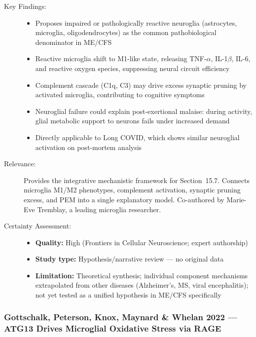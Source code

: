 
\begin{description}
    \item[Key Findings:]
    \begin{itemize}
        \item Proposes impaired or pathologically reactive neuroglia (astrocytes, microglia, oligodendrocytes) as the common pathobiological denominator in ME/CFS
        \item Reactive microglia shift to M1-like state, releasing TNF-$\alpha$, IL-1$\beta$, IL-6, and reactive oxygen species, suppressing neural circuit efficiency
        \item Complement cascade (C1q, C3) may drive excess synaptic pruning by activated microglia, contributing to cognitive symptoms
        \item Neuroglial failure could explain post-exertional malaise: during activity, glial metabolic support to neurons fails under increased demand
        \item Directly applicable to Long COVID, which shows similar neuroglial activation on post-mortem analysis
    \end{itemize}
    \item[Relevance:] Provides the integrative mechanistic framework for Section~15.7. Connects microglia M1/M2 phenotypes, complement activation, synaptic pruning excess, and PEM into a single explanatory model. Co-authored by Marie-Eve Tremblay, a leading microglia researcher.
    \item[Certainty Assessment:]
    \begin{itemize}
        \item \textbf{Quality:} High (Frontiers in Cellular Neuroscience; expert authorship)
        \item \textbf{Study type:} Hypothesis/narrative review --- no original data
        \item \textbf{Limitation:} Theoretical synthesis; individual component mechanisms extrapolated from other diseases (Alzheimer's, MS, viral encephalitis); not yet tested as a unified hypothesis in ME/CFS specifically
    \end{itemize}
\end{description}

\subsubsection*{Gottschalk, Peterson, Knox, Maynard \& Whelan 2022 --- ATG13 Drives Microglial Oxidative Stress via RAGE}

